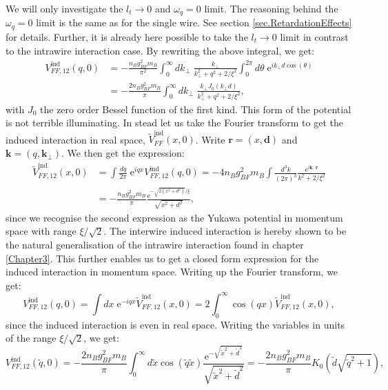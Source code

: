 We will only investigate the $l_t \to 0$ and $\omega_q = 0$ limit. The reasoning behind the $\omega_q = 0$ limit is the same as for the single wire. See section \ref{sec.RetardationEffects} for details. Further, it is already here possible to take the $l_t \to 0$ limit in contrast to the intrawire interaction case. By rewriting the above integral, we get:
\begin{align}
V_{FF,12}^\text{ind}(q,0) &= -\frac{n_Bg_{BF}^2m_B}{\pi^2}\int_0^\infty d k_\perp \; \frac{k_\perp}{k_\perp^2 + q^2 + 2/\xi^2} \int_0^{2\pi} d\theta \; \text{e}^{ik_\perp d\cos(\theta)} \nonumber \\
						  &= -\frac{2n_Bg_{BF}^2m_B}{\pi}\int_0^\infty d k_\perp \; \frac{k_\perp J_0(k_\perp d)}{k_\perp^2 + q^2 + 2/\xi^2},
\label{eq.secondwireinducedinteractionmomentumspaceintegralexpression}
\end{align}
with $J_0$ the zero order Bessel function of the first kind. This form of the potential is not terrible illuminating. In stead let us take the Fourier transform to get the induced interaction in real space, $\tilde{V}^\text{ind}_{FF}(x,0)$. Write $\mathbf{r} = (x,\mathbf{d})$ and $\mathbf{k} = (q,\mathbf{k}_\perp)$. We then get the expression:
\begin{align}
\tilde{V}_{FF,12}^\text{ind}(x,0) &= \int \frac{dq}{2\pi} \; \text{e}^{iqx} V_{FF,12}^\text{ind}(q,0) = -4n_Bg^2_{BF}m_B\int \frac{d^3k}{(2\pi)^3} \frac{\text{e}^{i\mathbf{k}\cdot \mathbf{r}}}{k^2 + 2/\xi^2} \nonumber \\
								  &= -\frac{n_Bg^2_{BF}m_B}{\pi} \frac{\text{e}^{-\sqrt{2(x^2+d^2)}/\xi}}{\sqrt{x^2+d^2}},
\end{align}
since we recognise the second expression as the Yukawa potential in momentum space with range $\xi/\sqrt{2}$. The interwire induced interaction is hereby shown to be the natural generalisation of the intrawire interaction found in chapter \ref{Chapter3}. This further enables us to get a closed form expression for the induced interaction in momentum space. Writing up the Fourier transform, we get:
\begin{equation}
V^\text{ind}_{FF,12}(q,0) = \int dx \; \text{e}^{-iqx}\tilde{V}^\text{ind}_{FF,12}(x,0) = 2\int_0^\infty \cos(qx)\tilde{V}^\text{ind}_{FF,12}(x,0), \nonumber 
\end{equation}
since the induced interaction is even in real space. Writing the variables in units of the range $\xi/\sqrt{2}$, we get:
\begin{equation}
V^\text{ind}_{FF,12}(\tilde{q},0) = -\frac{2n_Bg^2_{BF}m_B}{\pi}\int_0^\infty d\tilde{x} \cos(\tilde{q}\tilde{x})\frac{ \text{e}^{ -\sqrt{\tilde{x}^2+\tilde{d}^2} } }{\sqrt{\tilde{x}^2+\tilde{d}^2}} = -\frac{2n_Bg^2_{BF}m_B}{\pi}K_0\left(\tilde{d}\sqrt{\tilde{q}^2+1}\right), \nonumber
\end{equation}
